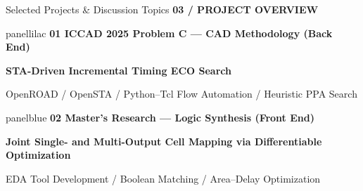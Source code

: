 \documentclass[aspectratio=169,10pt]{beamer}
\newcommand{\smalllabel}[1]{{\scriptsize\bfseries\color{Accent}\MakeUppercase{#1}}}
\newcommand{\slidenavigation}{}
\newcommand{\slideposition}{}
\newcommand{\slidesubtitle}[1]{%
  \smalllabel{#1}%
}
\begin{document}
\renewcommand{\slidenavigation}{\hyperlink{details-index}{\beamerbutton{Details index}}}
\renewcommand{\slideposition}{Summary 4 / 18}
\begin{frame}[label=summary-4]{Selected Projects \& Discussion Topics}
  \vspace{0.03cm}
  \slidesubtitle{03 / Project Overview}\par\vspace{0.11cm}
  \vfill
  \begin{beamercolorbox}[rounded=true,sep=0.20cm,wd=\linewidth]{panellilac}
    {\small\bfseries\color{Accent}01 \quad ICCAD 2025 Problem C --- CAD Methodology (Back End)}\par
    \vspace{0.05cm}
    {\normalsize\bfseries STA-Driven Incremental Timing ECO Search}\par
    \vspace{0.07cm}
    {\small OpenROAD / OpenSTA \quad / \quad Python--Tcl Flow Automation \quad / \quad Heuristic PPA Search}
  \end{beamercolorbox}
  \vfill
  \begin{beamercolorbox}[rounded=true,sep=0.20cm,wd=\linewidth]{panelblue}
    {\small\bfseries\color{AccentBlue}02 \quad Master's Research --- Logic Synthesis (Front End)}\par
    \vspace{0.05cm}
    {\normalsize\bfseries Joint Single- and Multi-Output Cell Mapping via Differentiable Optimization}\par
    \vspace{0.07cm}
    {\small EDA Tool Development \quad / \quad Boolean Matching \quad / \quad Area--Delay Optimization}
  \end{beamercolorbox}
  \vfill
\end{frame}
\end{document}
